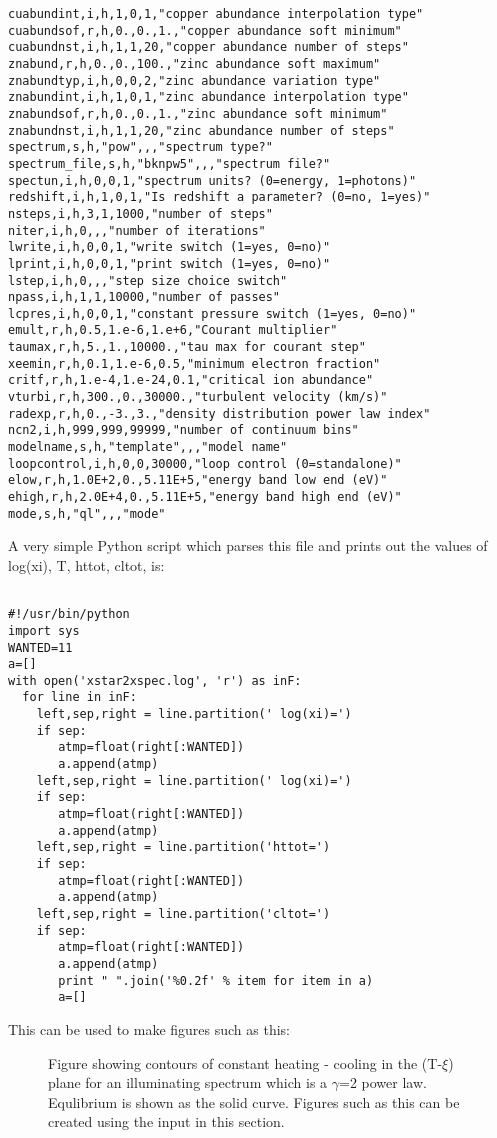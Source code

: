 \begin{verbatim}
cuabundint,i,h,1,0,1,"copper abundance interpolation type"
cuabundsof,r,h,0.,0.,1.,"copper abundance soft minimum"
cuabundnst,i,h,1,1,20,"copper abundance number of steps"
znabund,r,h,0.,0.,100.,"zinc abundance soft maximum"
znabundtyp,i,h,0,0,2,"zinc abundance variation type"
znabundint,i,h,1,0,1,"zinc abundance interpolation type"
znabundsof,r,h,0.,0.,1.,"zinc abundance soft minimum"
znabundnst,i,h,1,1,20,"zinc abundance number of steps"
spectrum,s,h,"pow",,,"spectrum type?"
spectrum_file,s,h,"bknpw5",,,"spectrum file?"
spectun,i,h,0,0,1,"spectrum units? (0=energy, 1=photons)"
redshift,i,h,1,0,1,"Is redshift a parameter? (0=no, 1=yes)"
nsteps,i,h,3,1,1000,"number of steps"
niter,i,h,0,,,"number of iterations"
lwrite,i,h,0,0,1,"write switch (1=yes, 0=no)"
lprint,i,h,0,0,1,"print switch (1=yes, 0=no)"
lstep,i,h,0,,,"step size choice switch"
npass,i,h,1,1,10000,"number of passes"
lcpres,i,h,0,0,1,"constant pressure switch (1=yes, 0=no)"
emult,r,h,0.5,1.e-6,1.e+6,"Courant multiplier"
taumax,r,h,5.,1.,10000.,"tau max for courant step"
xeemin,r,h,0.1,1.e-6,0.5,"minimum electron fraction"
critf,r,h,1.e-4,1.e-24,0.1,"critical ion abundance"
vturbi,r,h,300.,0.,30000.,"turbulent velocity (km/s)"
radexp,r,h,0.,-3.,3.,"density distribution power law index"
ncn2,i,h,999,999,99999,"number of continuum bins"
modelname,s,h,"template",,,"model name"
loopcontrol,i,h,0,0,30000,"loop control (0=standalone)"
elow,r,h,1.0E+2,0.,5.11E+5,"energy band low end (eV)"
ehigh,r,h,2.0E+4,0.,5.11E+5,"energy band high end (eV)"
mode,s,h,"ql",,,"mode"

\end{verbatim}

A very simple Python script which parses this file and prints out the values of 
log(xi), T, httot, cltot, is:

\begin{verbatim}

#!/usr/bin/python
import sys
WANTED=11
a=[]
with open('xstar2xspec.log', 'r') as inF:
  for line in inF:
    left,sep,right = line.partition(' log(xi)=')
    if sep: 
       atmp=float(right[:WANTED])
       a.append(atmp)
    left,sep,right = line.partition(' log(xi)=')
    if sep: 
       atmp=float(right[:WANTED])
       a.append(atmp)
    left,sep,right = line.partition('httot=')
    if sep: 
       atmp=float(right[:WANTED])
       a.append(atmp)
    left,sep,right = line.partition('cltot=')
    if sep: 
       atmp=float(right[:WANTED])
       a.append(atmp)
       print " ".join('%0.2f' % item for item in a)
       a=[]

\end{verbatim}

This can be used to make figures such as this:

\begin{figure}
\epsfxsize=5.6in  %
\epsfysize=7.0in  %
\caption{Figure showing contours of constant heating - cooling in the 
(T-$\xi$) plane for an illuminating spectrum which is a $\gamma$=2 power law.  
Equlibrium is shown as the solid curve.  Figures 
such as this can be created using the input in this section.}
\end{figure}

